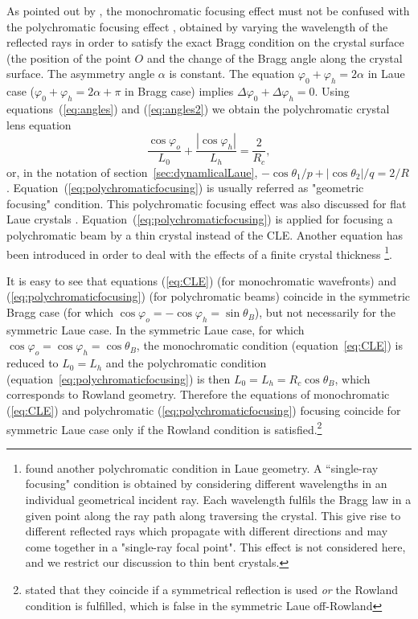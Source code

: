 \documentclass[preprint]{iucr}              %
\begin{document}
As pointed out by \cite{CK}, the monochromatic focusing effect must not be confused with the polychromatic focusing effect \cite{handbook,Schulze1998,Martinson}, obtained by varying the wavelength of the reflected rays in order to satisfy the exact Bragg condition on the crystal surface (the position of the point $O$ and the change of the Bragg angle along the crystal surface. The asymmetry angle $\alpha$ is constant. The equation $\varphi_0+\varphi_h=2\alpha$ in Laue case ($\varphi_0+\varphi_h=2\alpha+\pi$ in Bragg case) implies $\Delta\varphi_0+\Delta\varphi_h=0$. Using equations~(\ref{eq:angles}) and  (\ref{eq:angles2}) we obtain the polychromatic crystal lens equation
\begin{equation}
\label{eq:polychromaticfocusing}
\frac{{\cos {\varphi _o}}}{{{L_0}}} + \frac{{\left| {\cos {\varphi _h}} \right|}}{{{L_h}}} = \frac{2}{R_c},
\end{equation}
or, in the notation of section~\ref{sec:dynamlicalLaue}, $-\cos\theta_1/p + |\cos\theta_2|/q=2/R$. Equation~(\ref{eq:polychromaticfocusing}) is usually referred as "geometric focusing" condition. This polychromatic focusing effect was also discussed for flat Laue crystals \cite{sanchezdelrio1994}. Equation~(\ref{eq:polychromaticfocusing}) is applied for focusing a polychromatic beam by a thin crystal instead of the CLE. Another equation has been introduced in order to deal with the effects of a finite crystal thickness \cite{PengQi}\footnote{\cite{PengQi} found another polychromatic condition in Laue geometry. A ``single-ray focusing" condition is obtained by considering different wavelengths in an individual geometrical incident ray. Each wavelength fulfils the Bragg law in a given point along the ray path along traversing the crystal. This give rise to different reflected rays which propagate with different directions and may come together in a "single-ray focal point". This effect is not considered here, and we restrict our discussion to thin bent crystals. }.


It is easy to see that equations (\ref{eq:CLE}) (for monochromatic wavefronts) and (\ref{eq:polychromaticfocusing}) (for polychromatic beams) coincide in the symmetric Bragg case (for which $\cos\varphi_o=-\cos\varphi_h=\sin\theta_B$), but not necessarily for the symmetric Laue case. In the symmetric Laue case, for which $\cos\varphi_o=\cos\varphi_h=\cos\theta_B$, the monochromatic condition (equation~\ref{eq:CLE}) is reduced to $L_0=L_h$ and the polychromatic condition (equation~\ref{eq:polychromaticfocusing}) is then $L_0=L_h=R_c\cos\theta_B$, which corresponds to Rowland geometry. Therefore the equations of monochromatic (\ref{eq:CLE}) and polychromatic (\ref{eq:polychromaticfocusing}) focusing coincide for symmetric Laue case only if the Rowland condition is satisfied.\footnote{\cite{CK} stated that they coincide if a symmetrical reflection is used {\it or} the Rowland condition is fulfilled, which is false in the symmetric Laue off-Rowland}
\end{document}
